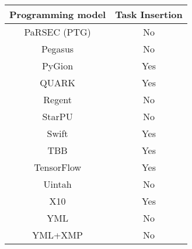 \begin{tabular}{cc}
\hline
Programming model & Task Insertion \\
\hline
PaRSEC (PTG) & No\\
Pegasus & No\\
PyGion & Yes\\
QUARK & Yes\\
Regent & No\\
StarPU & No\\
Swift & Yes\\
TBB & Yes\\
TensorFlow & Yes\\
Uintah & No\\
X10 & Yes\\
YML & No\\
YML+XMP & No\\
\hline
\end{tabular}

